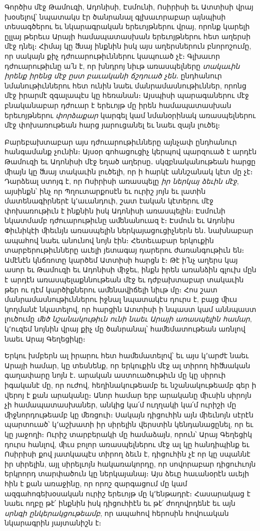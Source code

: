 \documentclass{article}
\begin{document}
{Գործիս մէջ Թամուզի, Ադոնիսի, Էսմունի, Ոսիրիսի եւ Ատտիսի վրայ խօսելով՝ նպատակս էր ծանրանալ գլխաւորաբար այնպիսի տեսագծերու եւ նկարագրական երեւոյթներու վրայ, որոնք կարելի ըլլայ թերեւս Արայի համապատասխան երեւոյթներու հետ աղերսի մէջ դնել։ Հիմայ կը ﬓայ ինքնին իսկ այս աղերսներուն բնորոշումը, որ սակայն քիչ դժուարութիւններու կապուած չէ։ Գլխաւոր դժուարութիւնը ա՛ն է, որ խնդրոյ նիւթ առասպելները \emph{տակաւին իրենք իրենց մէջ ըստ բաւականի ճշդուած չեն}․ ընդհանուր նմանութիւններու հետ ունին նաեւ մանրամասնութիւններ, որոնց մէջ իրարմէ զգալապէս կը հեռանան։ Այսպիսի պարագաներու մէջ բնականաբար դժուար է երեւոյթ մը իրեն համապատասխան երեւոյթներու \emph{փորձաքար} կարգել կամ նմանօրինակ առասպելներու մէջ փոխառութեան հարց յարուցանել եւ նաեւ զայն լուծել։

Բարեբախտաբար այս դժուարութիւնները այնչափ ընդհանուր հանգամանք չունին։ Այսօր գոհացուցիչ կերպով պարզուած է արդէն Թամուզի եւ Ադոնիսի մէջ եղած աղերսը․ սկզբնականութեան հարցը ﬕայն կը ﬓայ տակաւին լուծելի, որ ի հարկէ աննշանակ կէտ մը չէ։ Դարձեալ ստոյգ է, որ Ոսիրիսի առասպելը \emph{իր ներկայ ձեւին մէջ}, այսինքն՝ ինչ որ Պղուտարքոսէն եւ ուրիշ յոյն եւ լատին մատենագիրներէ կ՚աւանդուի, շատ էական կէտերու մէջ փոխառութիւն է ինքնին իսկ Ադոնիսի առասպելին։ Էսմունի նկատմամբ դժուարութիւնը աﬔնանուազ է։ Էսմուն եւ Ադոնիս Փիւնիկէի ﬕեւնյն առասպելին ներկայացուցիչներն են․ նախնաբար ապահով նաեւ անունով նոյն էին։ Հետեւաբար երկուքին տարբերութիւնները աւելի յետագայ դարերու ժառանգութիւն են։ Ամէնէն կնճռոտը կարծեմ Ատտիսի հարցն է։ Թէ ի՛նչ աղերս կայ ասոր եւ Թամուզի եւ Ադոնիսի ﬕջեւ, ինքն իրեն առանձին գլուխ մըն է արդէն առասպելաքննութեան մէջ եւ դժբախտաբար տակաւին թեր ու դէմ կարծիքներու աﬔնավիճելի նիւթ մը։ Հոս շատ մանրամասնութիւններու իջնալ նպատակէս դուրս է, բայց ﬕւս կողմանէ նկատելով, որ հարցին Ատտիսի ի նպաստ կամ աննպաստ լուծումը \emph{ﬔծ նշանակութիւն ունի նաեւ Արայի առասպելին համար}, կ՚ուզեմ նոյնին վրայ քիչ մը ծանրանալ՝ հաﬔմատութեան առնլով նաեւ Արայ Գեղեցիկը։

Երկու խմբերն ալ իրարու հետ հաﬔմատելով՝ եւ այս կ՚արժէ նաեւ Արայի համար, կը տեսնենք, որ երկուքին մէջ ալ տիրող հիﬓական գաղափարը նոյն է․ արական աստուածութիւն մը կը սիրուի իգականէ մը, որ ուժով, հեղինակութեամբ եւ նշանակութեամբ գեր ի վերոյ է քան արականը։ Անոր համար երբ արականը ﬕւսին սիրոյն չի համապատասխաներ, անկից կա՛մ ուղղակի կա՛մ ուրիշի մը ﬕջնորդութեամբ կը ﬔռցուի։ Սակայն դիցուհին այն ﬕեւնոյն սէրէն պարտուած՝ կ՚աշխատի իր սիրելին վերստին կենդանացընել, որ եւ կը յաջողի։ Ուրիշ տարբերակի մը համաձայն, որուն՝ Արայ Գեղեցիկ դուրս հանլով, ﬕւս բոլոր առասպելներու մէջ ալ կը հանդիպինք եւ Ոսիրիսի քով յատկապէս տիրող ձեւն է, դիցուհին չէ որ կը սպաննէ իր սիրելին, այլ սիրելւոյն հակառակորդը, որ սովորաբար դիցուհւոյն երկրորդ տարփածուն կը ներկայանայ։ Այս ձեւը հաւանօրէն աւեյի հին է քան առաջինը, որ որոշ զարգացում մը կամ ազգահոգեխօսական ուրիշ երեւոյթ մը կ՚ենթադրէ։ Հասարակաց է նաեւ ողբը թէ՛ ինքնին իսկ դիցուհիէն եւ թէ՛ ժողովրդենէ եւ այն \emph{սրնգի ընկերակցութեամբ}, որ ապահով հերոսին հովուական նկարագրին յայտանիշն է։

}
\end{document}

